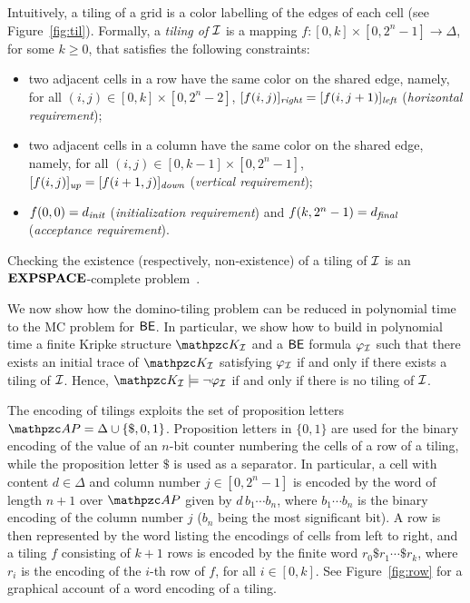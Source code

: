 Intuitively, a tiling of a grid is a color labelling of the edges of each cell (see Figure~\ref{fig:til}).
%
Formally, a \emph{tiling of $\mathcal{I}$}  is a mapping $f:[0,k]\times [0,2^{n}-1] \rightarrow \Delta$, for some $k\geq 0$, that satisfies the following constraints:
%
\begin{itemize}
  \item two adjacent cells in a row have the same color on the shared edge, namely, for all $(i,j)\in [0,k]\times [0,2^{n}-2]$,
   $[f(i,j)]_{\textit{right}}=[f(i,j+1)]_{\textit{left}}$ (\emph{horizontal requirement});
  \item two adjacent cells in a column have the same color on the shared edge, namely, for all $(i,j)\in [0,k-1]\times [0,2^{n}-1]$,
   $[f(i,j)]_{\textit{up}}=[f(i+1,j)]_{\textit{down}}$ (\emph{vertical requirement});
  \item $f(0,0)=d_{\textit{init}}$ (\emph{initialization requirement}) and $f(k,2^{n}-1)=d_{\textit{final}}$ (\emph{acceptance requirement}).
\end{itemize}
%

Checking the existence (respectively, non-existence) of a tiling of $\mathcal{I}$ is an $\textbf{EXPSPACE}$-complete problem~\cite{harel92}.

%

We now show how the domino-tiling problem can be reduced in polynomial time to the MC problem for $\mathsf{BE}$.
In particular, we show how to build in polynomial time a finite Kripke structure $\Ku_\Instance$ and a $\mathsf{BE}$ formula $\varphi_{\mathcal{I}}$ such that there exists an initial trace of $\Ku_\Instance$ satisfying $\varphi_{\mathcal{I}}$ if and only if there exists a tiling of $\mathcal{I}$. Hence, $\Ku_\Instance\models\neg\varphi_\Instance$ if and only if there is no tiling of $\mathcal{I}$.

The encoding of tilings exploits the set of proposition letters $\Prop = \Delta \cup \{\$,0,1\}$.
%
Proposition letters in $\{0,1\}$  are used for the binary encoding of the value of an $n$-bit counter numbering the cells of a row of a  tiling, while the proposition letter $\$$ is used as a separator.
In particular, a cell with content $d\in\Delta$ and column number $j\in [0,2^{n}-1]$ is encoded by the word of length $n+1$ over $\Prop$
given by $d \,b_1\cdots b_n$,
 where $b_1 \cdots b_n$ is the binary encoding of the column number $j$ ($b_n$ being the most significant bit). A row is then represented by the word listing the encodings of cells from left to right, and a tiling $f$  consisting of  $k+1$ rows is encoded by the finite word $r_0 \$ r_1 \cdots \$ r_k$, where $r_i$ is the encoding of the
  $i$-th row of $f$, for all $i\in [0,k]$. See Figure~\ref{fig:row} for a graphical account of a word encoding of a tiling.
  
